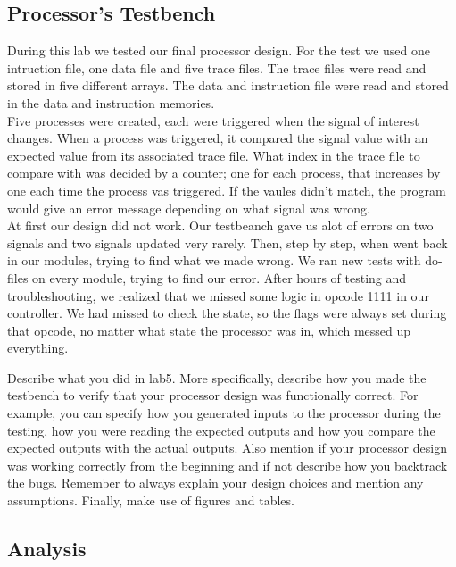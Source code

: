 \documentclass[a4paper]{article}
\begin{document}
\subsection{Processor's Testbench}

During this lab we tested our final processor design.
For the test we used one intruction file, one data file and five trace files.
The trace files were read and stored in five different arrays.
The data and instruction file were read and stored in the data and instruction memories.\\
Five processes were created, each were triggered when the signal of interest changes.
When a process was triggered, it compared the signal value with an expected value from its associated trace file. What index in the trace file to compare with was decided by a counter; one for each process, that increases by one each time the process vas triggered.
If the vaules didn't match, the program would give an error message depending on what signal was wrong.\\
At first our design did not work. Our testbeanch gave us alot of errors on two signals and two signals updated very rarely. 
Then, step by step, when went back in our modules, trying to find what we made wrong.
We ran new tests with do-files on every module, trying to find our error.
After hours of testing and troubleshooting, we realized that we missed some logic in opcode 1111 in our controller. We had missed to check the state, so the flags were always set during that opcode, no matter what state the processor was in, which messed up everything.

Describe what you did in lab5. More specifically, describe how you made
the testbench to verify that your processor design was functionally correct.
For example, you can specify how you generated inputs to the processor
during the testing, how you were reading the expected outputs and how
you compare the expected outputs with the actual outputs. Also mention if
your processor design was working correctly from the beginning and if not
describe how you backtrack the bugs. Remember to always explain your
design choices and mention any assumptions. Finally, make use of figures
and tables.

\subsection{Analysis}
\end{document}
